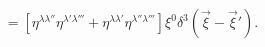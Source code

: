 \begin{equation}
[a^{\lambda\lambda'}(\xi),a^{\dagger\lambda''\lambda'''}(\xi')]=
\left[\eta^{\lambda\lambda''}\eta^{\lambda'\lambda'''}
+\eta^{\lambda\lambda'}\eta^{\lambda''\lambda'''}\right]\xi^0\delta^3(\vec\xi-\vec\xi').
\end{equation}

